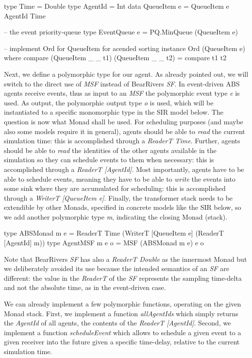 \begin{HaskellCode}
type Time        = Double
type AgentId     = Int
data QueueItem e = QueueItem e AgentId Time

-- the event priority-queue
type EventQueue e = PQ.MinQueue (QueueItem e)

-- implement Ord for QueueItem for acended sorting
instance Ord (QueueItem e) where
  compare (QueueItem _ _ t1) (QueueItem _ _ t2) = compare t1 t2
\end{HaskellCode}

Next, we define a polymorphic type for our agent. As already pointed out, we will switch to the direct use of \textit{MSF} instead of BearRivers \textit{SF}. In event-driven ABS agents receive events, thus as input to an \textit{MSF} the polymorphic event type \textit{e} is used. As output, the polymorphic output type \textit{o} is used, which will be instantiated to a specific monomorphic type in the SIR model below. The question is now what Monad shall be used. For scheduling purposes (and maybe also some models require it in general), agents should be able to \textit{read} the current simulation time: this is accomplished through a \textit{ReaderT Time}. Further, agents should be able to \textit{read} the identities of the other agents available in the simulation so they can schedule events to them when necessary: this is accomplished through a \textit{ReaderT [AgentId]}. Most importantly, agents have to be able to schedule events, meaning they have to be able to \textit{write} the events into some sink where they are accumulated for scheduling: this is accomplished through a \textit{WriterT [QueueItem e]}. Finally, the transformer stack needs to be extendible by other Monads, specified in concrete models like the SIR below, so we add another polymorphic type \textit{m}, indicating the closing Monad (stack).

\begin{HaskellCode}
type ABSMonad m e   = ReaderT Time (WriterT [QueueItem e] (ReaderT [AgentId] m))
type AgentMSF m e o = MSF (ABSMonad m e) e o
\end{HaskellCode}

Note that BearRivers \textit{SF} has also a \textit{ReaderT Double} as the innermost Monad but we deliberately avoided its use because the intended semantics of an \textit{SF} are different: the value in the \textit{ReaderT} of the \textit{SF} represents the sampling time-delta and not the absolute time, as in the event-driven case.

We can already implement a few polymorphic functions, operating on the given Monad stack. First, we implement a function \textit{allAgentIds} which simply returns the \textit{AgentId} of all agents, the contents of the \textit{ReaderT [AgentId]}. Second, we implement a function \textit{scheduleEvent} which allows to schedule a given event to a given receiver into the future given a specific time-delay, relative to the current simulation time.
 
